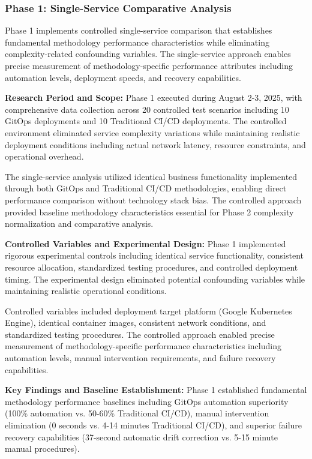 \subsubsection{Phase 1: Single-Service Comparative Analysis}

Phase 1 implements controlled single-service comparison that establishes fundamental methodology performance characteristics while eliminating complexity-related confounding variables. The single-service approach enables precise measurement of methodology-specific performance attributes including automation levels, deployment speeds, and recovery capabilities.

\textbf{Research Period and Scope:}
Phase 1 executed during August 2-3, 2025, with comprehensive data collection across 20 controlled test scenarios including 10 GitOps deployments and 10 Traditional CI/CD deployments. The controlled environment eliminated service complexity variations while maintaining realistic deployment conditions including actual network latency, resource constraints, and operational overhead.

The single-service analysis utilized identical business functionality implemented through both GitOps and Traditional CI/CD methodologies, enabling direct performance comparison without technology stack bias. The controlled approach provided baseline methodology characteristics essential for Phase 2 complexity normalization and comparative analysis.

\textbf{Controlled Variables and Experimental Design:}
Phase 1 implemented rigorous experimental controls including identical service functionality, consistent resource allocation, standardized testing procedures, and controlled deployment timing. The experimental design eliminated potential confounding variables while maintaining realistic operational conditions.

Controlled variables included deployment target platform (Google Kubernetes Engine), identical container images, consistent network conditions, and standardized testing procedures. The controlled approach enabled precise measurement of methodology-specific performance characteristics including automation levels, manual intervention requirements, and failure recovery capabilities.

\textbf{Key Findings and Baseline Establishment:}
Phase 1 established fundamental methodology performance baselines including GitOps automation superiority (100\% automation vs. 50-60\% Traditional CI/CD), manual intervention elimination (0 seconds vs. 4-14 minutes Traditional CI/CD), and superior failure recovery capabilities (37-second automatic drift correction vs. 5-15 minute manual procedures).


